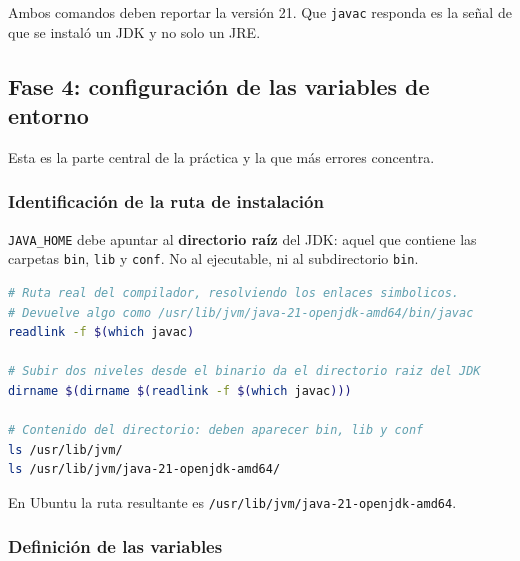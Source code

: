 Ambos comandos deben reportar la versión 21. Que \texttt{javac} responda es la señal de
que se instaló un JDK y no solo un JRE.


\subsection{Fase 4: configuración de las variables de entorno}

Esta es la parte central de la práctica y la que más errores concentra.

\subsubsection{Identificación de la ruta de instalación}

\texttt{JAVA\_HOME} debe apuntar al \textbf{directorio raíz} del JDK: aquel que contiene
las carpetas \texttt{bin}, \texttt{lib} y \texttt{conf}. No al ejecutable, ni al
subdirectorio \texttt{bin}.

\begin{lstlisting}[language=bash,caption={Localización del directorio raíz del JDK},morekeywords={readlink,which,dirname,ls,update-alternatives}]
# Ruta real del compilador, resolviendo los enlaces simbolicos.
# Devuelve algo como /usr/lib/jvm/java-21-openjdk-amd64/bin/javac
readlink -f $(which javac)

# Subir dos niveles desde el binario da el directorio raiz del JDK
dirname $(dirname $(readlink -f $(which javac)))

# Contenido del directorio: deben aparecer bin, lib y conf
ls /usr/lib/jvm/
ls /usr/lib/jvm/java-21-openjdk-amd64/
\end{lstlisting}

En Ubuntu la ruta resultante es \texttt{/usr/lib/jvm/java-21-openjdk-amd64}.


\subsubsection{Definición de las variables}

